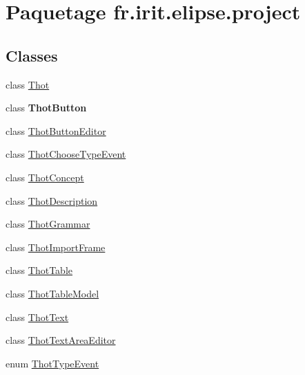 \hypertarget{namespacefr_1_1irit_1_1elipse_1_1project}{}\section{Paquetage fr.\+irit.\+elipse.\+project}
\label{namespacefr_1_1irit_1_1elipse_1_1project}
\subsection*{Classes}
\begin{DoxyCompactItemize}
\item 
class \mbox{\hyperlink{classfr_1_1irit_1_1elipse_1_1project_1_1_thot}{Thot}}
\item 
class {\bfseries Thot\+Button}
\item 
class \mbox{\hyperlink{classfr_1_1irit_1_1elipse_1_1project_1_1_thot_button_editor}{Thot\+Button\+Editor}}
\item 
class \mbox{\hyperlink{classfr_1_1irit_1_1elipse_1_1project_1_1_thot_choose_type_event}{Thot\+Choose\+Type\+Event}}
\item 
class \mbox{\hyperlink{classfr_1_1irit_1_1elipse_1_1project_1_1_thot_concept}{Thot\+Concept}}
\item 
class \mbox{\hyperlink{classfr_1_1irit_1_1elipse_1_1project_1_1_thot_description}{Thot\+Description}}
\item 
class \mbox{\hyperlink{classfr_1_1irit_1_1elipse_1_1project_1_1_thot_grammar}{Thot\+Grammar}}
\item 
class \mbox{\hyperlink{classfr_1_1irit_1_1elipse_1_1project_1_1_thot_import_frame}{Thot\+Import\+Frame}}
\item 
class \mbox{\hyperlink{classfr_1_1irit_1_1elipse_1_1project_1_1_thot_table}{Thot\+Table}}
\item 
class \mbox{\hyperlink{classfr_1_1irit_1_1elipse_1_1project_1_1_thot_table_model}{Thot\+Table\+Model}}
\item 
class \mbox{\hyperlink{classfr_1_1irit_1_1elipse_1_1project_1_1_thot_text}{Thot\+Text}}
\item 
class \mbox{\hyperlink{classfr_1_1irit_1_1elipse_1_1project_1_1_thot_text_area_editor}{Thot\+Text\+Area\+Editor}}
\item 
enum \mbox{\hyperlink{enumfr_1_1irit_1_1elipse_1_1project_1_1_thot_type_event}{Thot\+Type\+Event}}
\end{DoxyCompactItemize}


